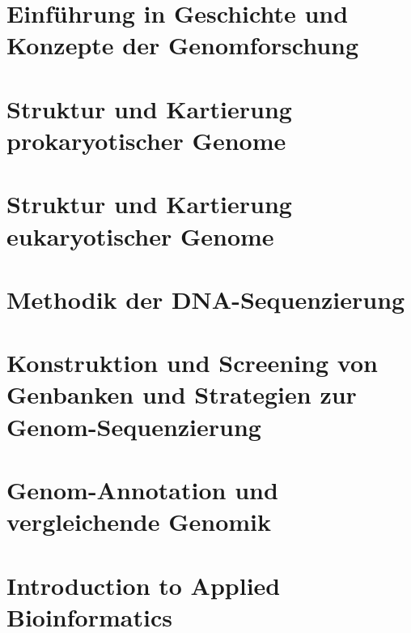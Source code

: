 

\tableofcontents 


\chapter{Einführung in Geschichte und Konzepte der Genomforschung}    \label{sec:einführung}


\chapter{Struktur und Kartierung prokaryotischer Genome}


\chapter{Struktur und Kartierung eukaryotischer Genome}

 
\chapter{Methodik der DNA-Sequenzierung}


\chapter{Konstruktion und Screening von Genbanken und Strategien zur Genom-Sequenzierung} 


\chapter{Genom-Annotation und vergleichende Genomik}


\chapter{Introduction to Applied Bioinformatics}
 


